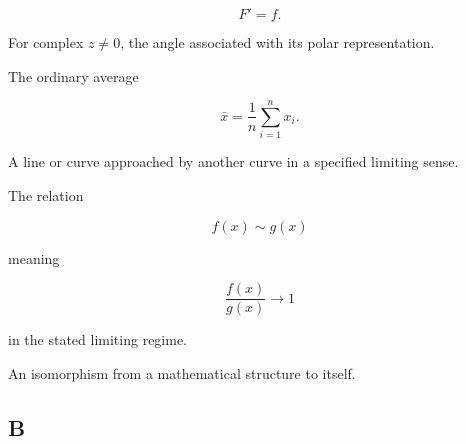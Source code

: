 \begin{description}
\[
F'=f.
\]

\item[Argument.]
For complex \(z\neq0\), the angle associated with its polar representation.

\item[Arithmetic mean.]
The ordinary average

\[
\bar{x}
=
\frac1n
\sum_{i=1}^{n}x_i.
\]

\item[Asymptote.]
A line or curve approached by another curve in a specified limiting sense.

\item[Asymptotic equivalence.]
The relation

\[
f(x)\sim g(x)
\]

meaning

\[
\frac{f(x)}{g(x)}
\to1
\]

in the stated limiting regime.

\item[Automorphism.]
An isomorphism from a mathematical structure to itself.

\end{description}

\subsection*{B}

